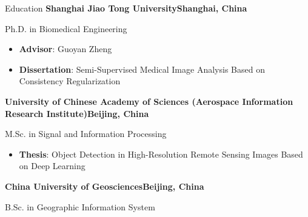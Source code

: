 \begin{rubric}{Education}
\entry*[2019 -- 2024]%
	\textbf{Shanghai Jiao Tong University}\hfill \textbf{Shanghai, China}
 \par 
 Ph.D. in Biomedical Engineering
\begin{itemize}
 \item \textbf{Advisor}: Guoyan Zheng
 \item \textbf{Dissertation}: Semi-Supervised Medical Image Analysis Based on Consistency Regularization
 \end{itemize}
	
%
\entry*[2015 -- 2018]%
	\textbf{University of Chinese Academy of Sciences (Aerospace Information Research Institute)}\hfill \textbf{Beijing, China}  \par
 M.Sc. in Signal and Information Processing
  \begin{itemize}
 \item \textbf{Thesis}: Object Detection in High-Resolution Remote Sensing Images Based on Deep Learning
 \end{itemize}
	
% 
\entry*[2011 -- 2015]%
	\textbf{China University of Geosciences}\hfill \textbf{Beijing, China}\par
 B.Sc. in Geographic Information System


\end{rubric}
